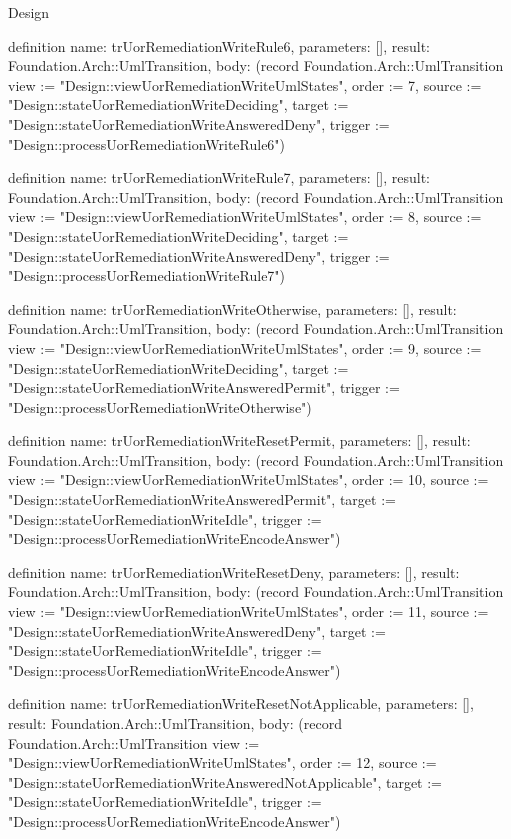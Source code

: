 \begin{lexlean}{Design}
\begin{semanticmodule}
definition{
  name: trUorRemediationWriteRule6,
  parameters: [],
  result: Foundation.Arch::UmlTransition,
  body: (record Foundation.Arch::UmlTransition {view := "Design::viewUorRemediationWriteUmlStates", order := 7, source := "Design::stateUorRemediationWriteDeciding", target := "Design::stateUorRemediationWriteAnsweredDeny", trigger := "Design::processUorRemediationWriteRule6"})
}

definition{
  name: trUorRemediationWriteRule7,
  parameters: [],
  result: Foundation.Arch::UmlTransition,
  body: (record Foundation.Arch::UmlTransition {view := "Design::viewUorRemediationWriteUmlStates", order := 8, source := "Design::stateUorRemediationWriteDeciding", target := "Design::stateUorRemediationWriteAnsweredDeny", trigger := "Design::processUorRemediationWriteRule7"})
}

definition{
  name: trUorRemediationWriteOtherwise,
  parameters: [],
  result: Foundation.Arch::UmlTransition,
  body: (record Foundation.Arch::UmlTransition {view := "Design::viewUorRemediationWriteUmlStates", order := 9, source := "Design::stateUorRemediationWriteDeciding", target := "Design::stateUorRemediationWriteAnsweredPermit", trigger := "Design::processUorRemediationWriteOtherwise"})
}

definition{
  name: trUorRemediationWriteResetPermit,
  parameters: [],
  result: Foundation.Arch::UmlTransition,
  body: (record Foundation.Arch::UmlTransition {view := "Design::viewUorRemediationWriteUmlStates", order := 10, source := "Design::stateUorRemediationWriteAnsweredPermit", target := "Design::stateUorRemediationWriteIdle", trigger := "Design::processUorRemediationWriteEncodeAnswer"})
}

definition{
  name: trUorRemediationWriteResetDeny,
  parameters: [],
  result: Foundation.Arch::UmlTransition,
  body: (record Foundation.Arch::UmlTransition {view := "Design::viewUorRemediationWriteUmlStates", order := 11, source := "Design::stateUorRemediationWriteAnsweredDeny", target := "Design::stateUorRemediationWriteIdle", trigger := "Design::processUorRemediationWriteEncodeAnswer"})
}

definition{
  name: trUorRemediationWriteResetNotApplicable,
  parameters: [],
  result: Foundation.Arch::UmlTransition,
  body: (record Foundation.Arch::UmlTransition {view := "Design::viewUorRemediationWriteUmlStates", order := 12, source := "Design::stateUorRemediationWriteAnsweredNotApplicable", target := "Design::stateUorRemediationWriteIdle", trigger := "Design::processUorRemediationWriteEncodeAnswer"})
}


\end{semanticmodule}
\end{lexlean}
